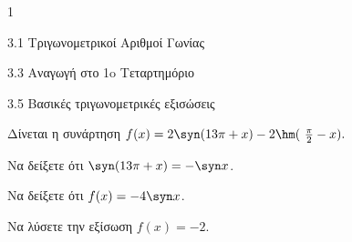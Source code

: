 \begin{ylh}{1}
\item 3.1 Τριγωνομετρικοί Αριθμοί Γωνίας
\item 3.3 Αναγωγή στο 1o Τεταρτημόριο
\item 3.5 Βασικές τριγωνομετρικές εξισώσεις
\end{ylh}
Δίνεται η συνάρτηση $f(x) = 2\syn (13\pi + x) - 2\hm (\ \frac{\pi}{2} - x).$
\begin{alist}
\item Να δείξετε ότι $\syn (13\pi + x) = - \syn  x$.
\item Να δείξετε ότι $f(x) = - 4\syn  x$.
\item Να λύσετε την εξίσωση $f(x) = - 2$.
\end{alist}

